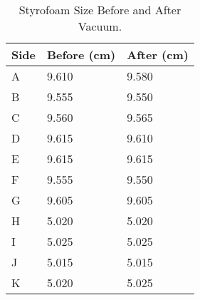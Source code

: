 \begin{table}[H]
\centering
\begin{tabular}{|l|l|l|}
\hline
Side & Before (cm) & After (cm) \\ \hline
A & 9.610 & 9.580 \\ \hline
B & 9.555 & 9.550 \\ \hline
C & 9.560 & 9.565 \\ \hline
D & 9.615 & 9.610 \\ \hline
E & 9.615 & 9.615 \\ \hline
F & 9.555 & 9.550 \\ \hline
G & 9.605 & 9.605 \\ \hline
H & 5.020 & 5.020 \\ \hline
I & 5.025 & 5.025 \\ \hline
J & 5.015 & 5.015 \\ \hline
K & 5.020 & 5.025 \\ \hline
\end{tabular}
\caption{Styrofoam Size Before and After Vacuum.}
\label{tab:styrofoam-test-result-2}
\end{table}
